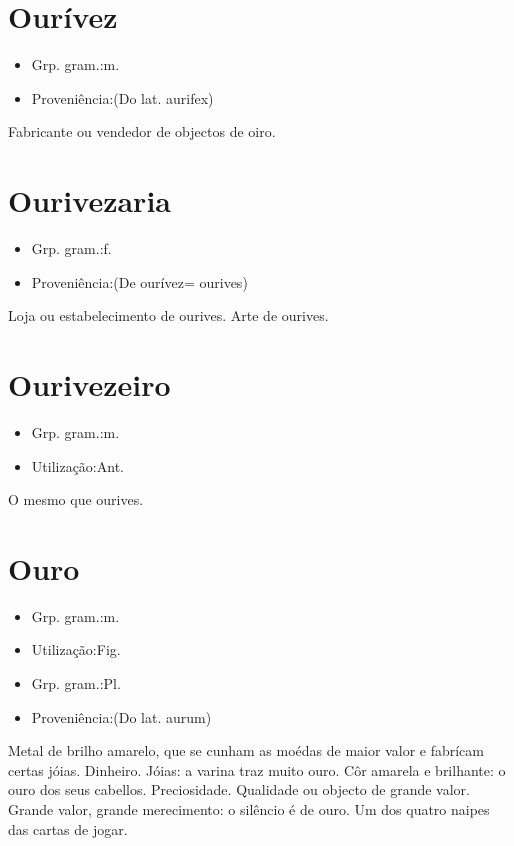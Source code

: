 \section{Ourívez}
\begin{itemize}
\item {Grp. gram.:m.}
\end{itemize}
\begin{itemize}
\item {Proveniência:(Do lat. \textunderscore aurifex\textunderscore )}
\end{itemize}
Fabricante ou vendedor de objectos de oiro.
\section{Ourivezaria}
\begin{itemize}
\item {Grp. gram.:f.}
\end{itemize}
\begin{itemize}
\item {Proveniência:(De \textunderscore ourívez\textunderscore  = \textunderscore ourives\textunderscore )}
\end{itemize}
Loja ou estabelecimento de ourives.
Arte de ourives.
\section{Ourivezeiro}
\begin{itemize}
\item {Grp. gram.:m.}
\end{itemize}
\begin{itemize}
\item {Utilização:Ant.}
\end{itemize}
O mesmo que \textunderscore ourives\textunderscore .
\section{Ouro}
\begin{itemize}
\item {Grp. gram.:m.}
\end{itemize}
\begin{itemize}
\item {Utilização:Fig.}
\end{itemize}
\begin{itemize}
\item {Grp. gram.:Pl.}
\end{itemize}
\begin{itemize}
\item {Proveniência:(Do lat. \textunderscore aurum\textunderscore )}
\end{itemize}
Metal de brilho amarelo, que se cunham as moédas de maior valor e fabrícam certas jóias.
Dinheiro.
Jóias: \textunderscore a varina traz muito ouro\textunderscore .
Côr amarela e brilhante: \textunderscore o ouro dos seus cabellos\textunderscore .
Preciosidade.
Qualidade ou objecto de grande valor.
Grande valor, grande merecimento: \textunderscore o silêncio é de ouro\textunderscore .
Um dos quatro naipes das cartas de jogar.
